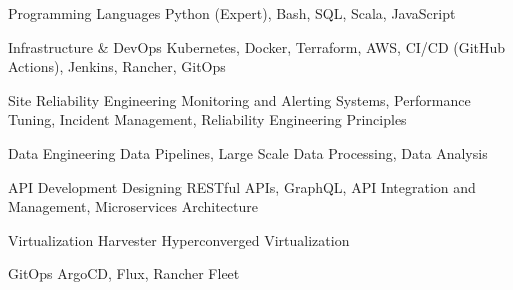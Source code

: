 


\begin{cvskills}


\cvskill
{Programming Languages} %
{Python (Expert), Bash, SQL, Scala, JavaScript} %


\cvskill
{Infrastructure \& DevOps} %
{Kubernetes, Docker, Terraform, AWS, CI/CD (GitHub Actions), Jenkins, Rancher, GitOps} %


\cvskill
{Site Reliability Engineering} %
{Monitoring and Alerting Systems, Performance Tuning, Incident Management, Reliability Engineering Principles} %


\cvskill
{Data Engineering} %
{Data Pipelines, Large Scale Data Processing, Data Analysis} %


\cvskill
{API Development} %
{Designing RESTful APIs, GraphQL, API Integration and Management, Microservices Architecture} %


\cvskill
{Virtualization} %
{Harvester Hyperconverged Virtualization} %


\cvskill
{GitOps} %
{ArgoCD, Flux, Rancher Fleet} %




\end{cvskills}
